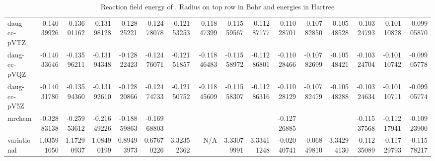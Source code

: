 \documentclass[../Thesis.tex]{subfiles}
\begin{document}
\begin{sidewaystable}
{{\begin{tabular}{l|r|r|r|r|r|r|r|r|r|r|r|r|r|r|r}
daug-cc-pVTZ & -0.14039926 & -0.13601162 & -0.13198128 & -0.12825221 & -0.12478078 & -0.12153253 & -0.11847399 & -0.11559567 & -0.11287177 & -0.11028701 & -0.10782850 & -0.10548528 & -0.10324793 & -0.10110828 & -0.09905870 \\
daug-cc-pVQZ & -0.14033646 & -0.13596211 & -0.13194348 & -0.12822423 & -0.12476071 & -0.12151857 & -0.11846483 & -0.11558972 & -0.11286801 & -0.11028466 & -0.10782699 & -0.10548421 & -0.10324704 & -0.10110742 & -0.09905778 \\
daug-cc-pV5Z & -0.14031780 & -0.13594360 & -0.13192610 & -0.12820866 & -0.12474733 & -0.12150752 & -0.11845609 & -0.11558307 & -0.11286316 & -0.11028129 & -0.10782479 & -0.10548288 & -0.10324634 & -0.10110711 & -0.09905774 \\ \hline
mrchem & -0.32883138 & -0.25953612 & -0.21649226 & -0.18859863 & -0.16968803 & \multicolumn{1}{l|}{} & \multicolumn{1}{l|}{} & \multicolumn{1}{l|}{} & \multicolumn{1}{l|}{} & -0.12726885 & \multicolumn{1}{l|}{} & \multicolumn{1}{l|}{} & -0.11537568 & -0.11217941 & -0.10923900 \\
variational & 1.03591050 & 1.17290937 & 1.08490199 & 0.89493973 & 0.67670226 & 3.32352362 & N/A & 3.33079991 & 3.33411248 & -0.02040741 & -0.06849810 & 3.34294130 & -0.11235089 & -0.11729793 & -0.11578217 \\
\end{tabular}}}{\caption{Reaction field energy of . Radius on top row in Bohr and energies in Hartree}
  \label{tab:Erdatanop}}


\end{sidewaystable}
\end{document}
